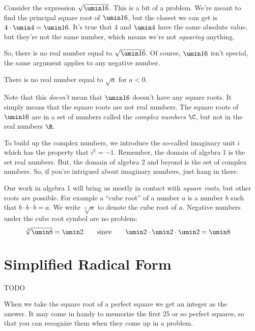 Consider the expression $\sqrt{\umin16}$. This is a bit of a problem. We're meant to find the principal square root of $\umin16$, but the closest we can get is $4 \cdot \umin4 = \umin16$. It's true that $4$ and $\umin4$ have the same absolute value, but they're not the same number, which means we're not \textit{squaring} anything.

So, there is no real number equal to $\sqrt{\umin16}$. Of course, $\umin16$ isn't special, the same argument applies to any negative number.

\begin{boxeddef}
There is no real number equal to $\sqrt{a}$ for $a < 0$.
\end{boxeddef}

Note that this \textit{doesn't} mean that $\umin16$ doesn't have any square roots. It simply means that the square roots are not real numbers. The square roots of $\umin16$ are in a set of numbers called the \textit{complex numbers} $\C$, but not in the real numbers $\R$.

To build up the complex numbers, we introduce the so-called imaginary unit $i$ which has the property that $i^2 = −1$. Remember, the domain of algebra 1 is the set real numbers. But, the domain of algebra 2 and beyond is the set of complex numbers. So, if you're intrigued about imaginary numbers, just hang in there.

Our work in algebra 1 will bring us mostly in contact with \textit{square roots}, but other roots are possible. For example a ``cube root'' of a number $a$ is a number $b$ such that $b\cdot b\cdot b = a$. We write $\sqrt[3]{a}$ to denote the cube root of $a$. Negative numbers under the cube root symbol are no problem: \[\sqrt[3]{\umin8} = \umin2 \qquad\text{since}\qquad \umin2\cdot\umin2\cdot\umin2 = \umin8\]


\section{Simplified Radical Form}
\label{sec:radsimplifiedform}

\begin{boxedexplore}
TODO
\end{boxedexplore}

When we take the square root of a perfect square we get an integer as the answer. It may come in handy to memorize the first 25 or so perfect squares, so that you can recognize them when they come up in a problem.

